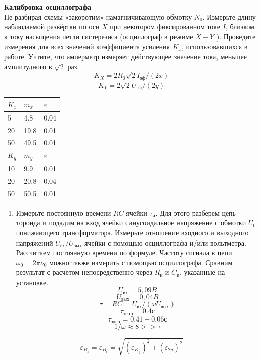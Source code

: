 \documentclass[12pt,a4paper]{article}
\begin{document}
\textbf{Калибровка осциллографа} \\ 
Не разбирая схемы «закоротим» намагничивающую обмотку $N_0$.
Измерьте длину наблюдаемой развёртки по оси $X$ при некотором
фиксированном токе $I$, близком к току насыщения петли гистерезиса (осциллограф в режиме $X-Y$ ). Проведите измерения для всех
значений коэффициента усиления $K_x$, использовавшихся в работе.
Учтите, что амперметр измеряет действующее значение тока, меньшее амплитудного в $\sqrt{2}$ раз.
\[
K_X = 2R_0 \sqrt{2} I_\text{эф} /(2x)
\]
\[
K_Y = 2 \sqrt{2} U_\text{эф} /(2y)
\]
\begin{table}[!ht]
    \centering
    \begin{tabular}{|l|l|l|}
    \hline
        $K_x$ & $m_x$ & $\varepsilon$  \\ \hline
        5 & 4.8 & 0.04  \\ \hline
        20 & 19.8 & 0.01  \\ \hline
        50 & 49.5 & 0.01  \\ \hline
        $K_y$ & $m_y$ & $\varepsilon$     \\ \hline
        10 & 9.9 & 0.01  \\ \hline
        20 & 20.8 & 0.04  \\ \hline
        50 & 50.5 & 0.01  \\ \hline
    \end{tabular}
\end{table}
\begin{enumerate}
    \item Измерьте постоянную времени $RC$-ячейки $\tau_{\text{и}}$. Для этого разберем цепь тороида и подадим на вход ячейки синусоидальное напряжение с обмотки $U_0$ понижающего трансформатора.
    Измерьте отношение входного и выходного напряжений $U_{\text{вх}}/U_{\text{вых}}$
    ячейки с помощью осциллографа и/или вольтметра. Рассчитаем постоянную времени по формуле. 
    Частоту сигнала в цепи $\omega_0 = 2\pi \nu_0$
    можно также измерить с помощью осциллографа.
    Сравним результат с расчётом непосредственно через $R_\text{и}$ и $C_\text{и}$, указанные на установке.
    \[
    U_\text{вх} = 5,09 B
    \]
    \[
    U_\text{вых} = 0,04 B 
    \]
    \[
    \tau = RC = U_{\text{вх}}/(\omega U_{\text{вых}})
    \]
    \[
    \tau_{\text{теор}} = 0.4 \text{с}
    \]
    \[
    \tau_{\text{эксп}} = 0.41 \pm 0.06 \text{с}
    \]
    \[
    1/\omega \approx 8 >> \tau
    \]

\end{enumerate}
\[
\varepsilon_{B_s} = \varepsilon_{B_r} = \sqrt{(\varepsilon_{K_y})^2 + (\varepsilon_{2y})^2 }
\]
\end{document}
